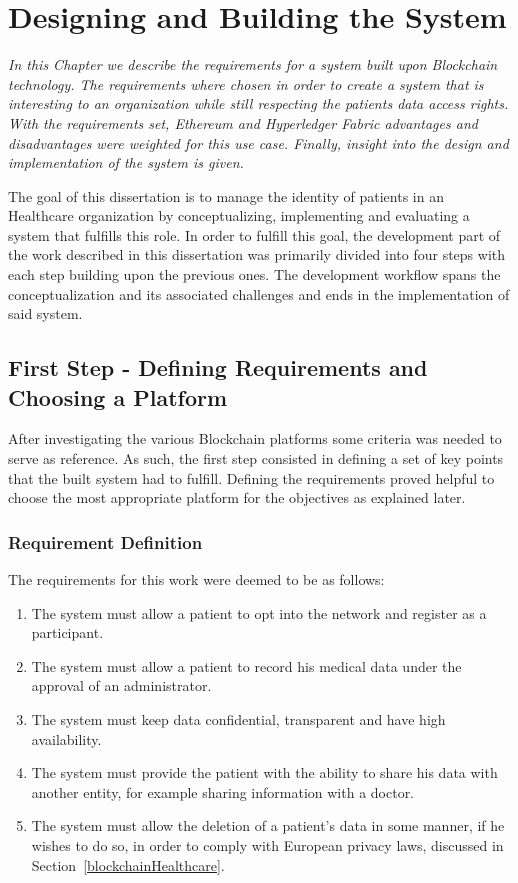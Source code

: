 \chapter{Designing and Building the System} \label{development}

\emph{In this Chapter we describe the requirements for a system built upon Blockchain
technology. The requirements where chosen in order to create a system
that is interesting to an organization while still respecting the patients data access rights. With the requirements set, Ethereum and
Hyperledger Fabric advantages and disadvantages were weighted for this use
case. Finally, insight into the design and implementation of the system is given.}

The goal of this dissertation is to manage the identity of patients in an Healthcare organization by
conceptualizing, implementing and evaluating a system that fulfills this role. In order to
fulfill this goal, the development part of the work described in this dissertation was primarily divided
into four steps with each step building upon the previous ones. The development workflow
spans the conceptualization and its associated challenges and ends in the
implementation of said system.

\section{First Step - Defining Requirements and Choosing a
Platform}\label{choosingHyperledger}

After investigating the various Blockchain platforms some criteria was needed
to serve as reference. As such, the first step consisted in defining a set of
key points that the built system had to fulfill. Defining the requirements
proved helpful to choose the most appropriate platform for the objectives as
explained later.

\subsection{Requirement Definition} 
The requirements for this work were deemed to be as follows:

\renewcommand{\labelenumi}{\Roman{enumi}.}
\begin{enumerate}
  \item The system must allow a patient to opt into the network and register as
    a participant.
  \item The system must allow a patient to record his medical data under the
    approval of an administrator.
  \item The system must keep data confidential, transparent and have
    high availability.
  \item The system must provide the patient with the ability to share his data with another entity, for example sharing
    information with a doctor.
  \item The system must allow the deletion of a patient's data in some manner,
    if he wishes to do so, in order to comply with European privacy laws,
    discussed in Section~\ref{blockchainHealthcare}.
\end{enumerate}

